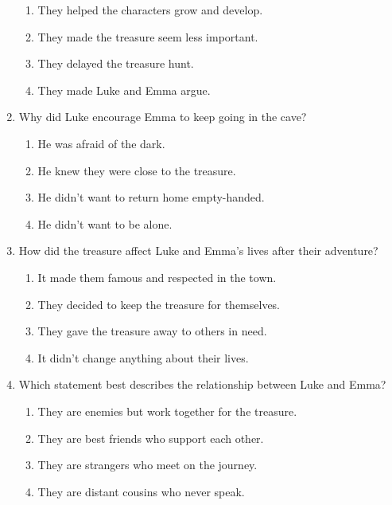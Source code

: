\documentclass[12pt]{article}
\begin{document}
\begin{enumerate}
\begin{enumerate}[label=\Alph*.]
    \item They helped the characters grow and develop.
    \item They made the treasure seem less important.
    \item They delayed the treasure hunt.
    \item They made Luke and Emma argue.
\end{enumerate}

\vspace{0.5cm}

\item Why did Luke encourage Emma to keep going in the cave?

\begin{enumerate}[label=\Alph*.]
    \item He was afraid of the dark.
    \item He knew they were close to the treasure.
    \item He didn’t want to return home empty-handed.
    \item He didn’t want to be alone.
\end{enumerate}

\vspace{0.5cm}

\item How did the treasure affect Luke and Emma’s lives after their adventure?

\begin{enumerate}[label=\Alph*.]
    \item It made them famous and respected in the town.
    \item They decided to keep the treasure for themselves.
    \item They gave the treasure away to others in need.
    \item It didn’t change anything about their lives.
\end{enumerate}

\vspace{0.5cm}

\item Which statement best describes the relationship between Luke and Emma?

\begin{enumerate}[label=\Alph*.]
    \item They are enemies but work together for the treasure.
    \item They are best friends who support each other.
    \item They are strangers who meet on the journey.
    \item They are distant cousins who never speak.
\end{enumerate}

\vspace{0.5cm}

\end{enumerate}
\end{document}
